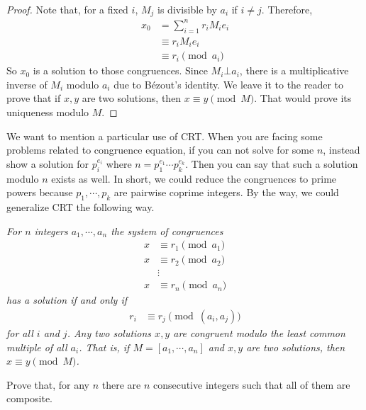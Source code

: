 \documentclass{subfile}
\begin{document}
		\begin{proof}
			Note that, for a fixed $i$, $M_j$ is divisible by $a_i$ if $i\neq j$. Therefore,
			\begin{align*}
			x_0
				& = \sum_{i=1}^{n} r_i M_ie_i\\
				& \equiv r_iM_ie_i\\
				& \equiv r_i\pmod{a_i}
			\end{align*}
			So $x_0$ is a solution to those congruences. Since $M_i\bot a_i$, there is a multiplicative inverse of $M_i$ modulo $a_i$ due to B\'{e}zout's identity. We leave it to the reader to prove that if $x,y$ are two solutions, then $x\equiv y\pmod M$. That would prove its uniqueness modulo $M$.
		\end{proof}
	We want to mention a particular use of CRT. When you are facing some problems related to congruence equation, if you can not solve for some $n$, instead show a solution for $p_i^{e_i}$ where $n=p_1^{e_1}\cdots p_k^{e_k}$. Then you can say that such a solution modulo $n$ exists as well. In short, we could reduce the congruences to prime powers because $p_1,\cdots,p_k$ are pairwise coprime integers. By the way, we could generalize CRT the following way.
		\begin{theorem}\slshape
			For $n$ integers $a_1,\cdots,a_n$ the system of congruences
			\begin{align*}
				x & \equiv r_1\pmod{a_1}\\
				x & \equiv r_2\pmod{a_2}\\
				&\vdots\\
				x & \equiv r_n\pmod{a_n}
			\end{align*}
			has a solution if and only if
			\begin{align*}
				r_i & \equiv r_j\pmod{(a_i,a_j)}
			\end{align*}
			for all $i$ and $j$. Any two solutions $x,y$ are congruent modulo the least common multiple of all $a_i$. That is, if $M=[a_1,\cdots,a_n]$ and $x,y$ are two solutions, then $x\equiv y\pmod M$.
		\end{theorem}

		\begin{problem}
			Prove that, for any $n$ there are $n$ consecutive integers such that all of them are composite.
		\end{problem}
\end{document}
